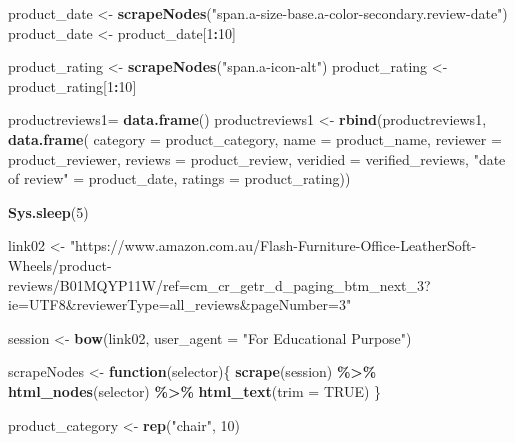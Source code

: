 \documentclass[
]{article}
\newenvironment{Shaded}{\begin{snugshade}}{\end{snugshade}}
\newcommand{\AttributeTok}[1]{\textcolor[rgb]{0.13,0.29,0.53}{#1}}
\newcommand{\ConstantTok}[1]{\textcolor[rgb]{0.56,0.35,0.01}{#1}}
\newcommand{\ControlFlowTok}[1]{\textcolor[rgb]{0.13,0.29,0.53}{\textbf{#1}}}
\newcommand{\DecValTok}[1]{\textcolor[rgb]{0.00,0.00,0.81}{#1}}
\newcommand{\FunctionTok}[1]{\textcolor[rgb]{0.13,0.29,0.53}{\textbf{#1}}}
\newcommand{\NormalTok}[1]{#1}
\newcommand{\OtherTok}[1]{\textcolor[rgb]{0.56,0.35,0.01}{#1}}
\newcommand{\SpecialCharTok}[1]{\textcolor[rgb]{0.81,0.36,0.00}{\textbf{#1}}}
\newcommand{\StringTok}[1]{\textcolor[rgb]{0.31,0.60,0.02}{#1}}
\begin{document}
\begin{Shaded}
\begin{Highlighting}[]
\NormalTok{  product\_date }\OtherTok{\textless{}{-}} \FunctionTok{scrapeNodes}\NormalTok{(}\StringTok{"span.a{-}size{-}base.a{-}color{-}secondary.review{-}date"}\NormalTok{)}
\NormalTok{  product\_date }\OtherTok{\textless{}{-}}\NormalTok{ product\_date[}\DecValTok{1}\SpecialCharTok{:}\DecValTok{10}\NormalTok{]}
  
\NormalTok{  product\_rating }\OtherTok{\textless{}{-}} \FunctionTok{scrapeNodes}\NormalTok{(}\StringTok{"span.a{-}icon{-}alt"}\NormalTok{)}
\NormalTok{  product\_rating }\OtherTok{\textless{}{-}}\NormalTok{ product\_rating[}\DecValTok{1}\SpecialCharTok{:}\DecValTok{10}\NormalTok{]}
  
\NormalTok{  productreviews1}\OtherTok{=} \FunctionTok{data.frame}\NormalTok{()}
\NormalTok{  productreviews1 }\OtherTok{\textless{}{-}} \FunctionTok{rbind}\NormalTok{(productreviews1, }\FunctionTok{data.frame}\NormalTok{(}
                      \AttributeTok{category =}\NormalTok{ product\_category,}
                      \AttributeTok{name =}\NormalTok{ product\_name,}
                      \AttributeTok{reviewer =}\NormalTok{ product\_reviewer,}
                      \AttributeTok{reviews =}\NormalTok{ product\_review,}
                      \AttributeTok{veridied =}\NormalTok{ verified\_reviews,}
                      \StringTok{"date of review"} \OtherTok{=}\NormalTok{ product\_date,}
                      \AttributeTok{ratings =}\NormalTok{ product\_rating))}

 \FunctionTok{Sys.sleep}\NormalTok{(}\DecValTok{5}\NormalTok{) }

\NormalTok{link02 }\OtherTok{\textless{}{-}} \StringTok{"https://www.amazon.com.au/Flash{-}Furniture{-}Office{-}LeatherSoft{-}Wheels/product{-}reviews/B01MQYP11W/ref=cm\_cr\_getr\_d\_paging\_btm\_next\_3?ie=UTF8\&reviewerType=all\_reviews\&pageNumber=3"}


\NormalTok{  session }\OtherTok{\textless{}{-}} \FunctionTok{bow}\NormalTok{(link02,}
               \AttributeTok{user\_agent =} \StringTok{"For Educational Purpose"}\NormalTok{)}

\NormalTok{  scrapeNodes }\OtherTok{\textless{}{-}} \ControlFlowTok{function}\NormalTok{(selector)\{}
    \FunctionTok{scrape}\NormalTok{(session) }\SpecialCharTok{\%\textgreater{}\%}
      \FunctionTok{html\_nodes}\NormalTok{(selector) }\SpecialCharTok{\%\textgreater{}\%}
      \FunctionTok{html\_text}\NormalTok{(}\AttributeTok{trim =} \ConstantTok{TRUE}\NormalTok{)}
\NormalTok{  \}}

\NormalTok{  product\_category }\OtherTok{\textless{}{-}} \FunctionTok{rep}\NormalTok{(}\StringTok{"chair"}\NormalTok{, }\DecValTok{10}\NormalTok{)}


\end{Highlighting}
\end{Shaded}
\end{document}
